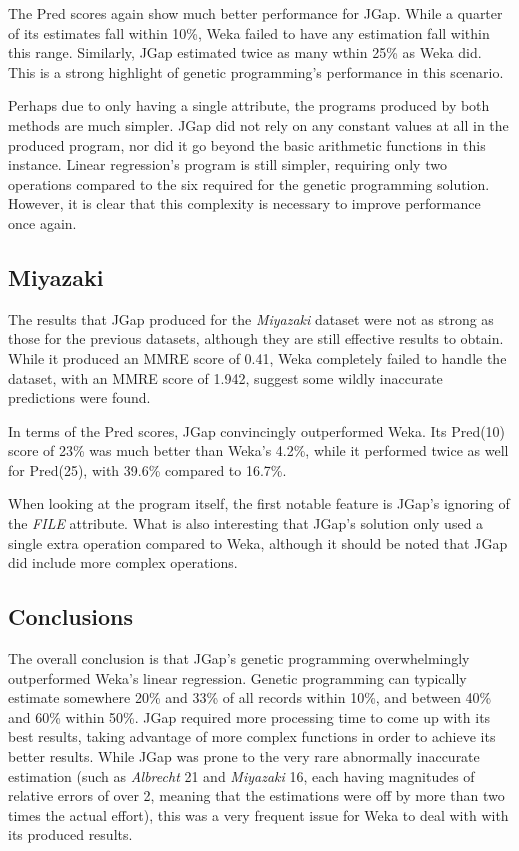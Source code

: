 \documentclass[11pt, a4paper]{article}
\begin{document}
The Pred scores again show much better performance for JGap. While a quarter of
its estimates fall within 10\%, Weka failed to have any estimation fall within
this range. Similarly, JGap estimated twice as many wthin 25\% as Weka did. This
is a strong highlight of genetic programming's performance in this scenario.

Perhaps due to only having a single attribute, the programs produced by both
methods are much simpler. JGap did not rely on any constant values at all in
the produced program, nor did it go beyond the basic arithmetic functions in
this instance. Linear regression's program is still simpler, requiring only two
operations compared to the six required for the genetic programming solution.
However, it is clear that this complexity is necessary to improve performance
once again.

\subsection{Miyazaki} %
\label{sub:miyazaki_comp}
The results that JGap produced for the \emph{Miyazaki} dataset were not as
strong as those for the previous datasets, although they are still effective
results to obtain. While it produced an MMRE score of 0.41, Weka completely
failed to handle the dataset, with an MMRE score of 1.942, suggest some wildly
inaccurate predictions were found.

In terms of the Pred scores, JGap convincingly outperformed Weka. Its Pred(10)
score of 23\% was much better than Weka's 4.2\%, while it performed twice as
well for Pred(25), with 39.6\% compared to 16.7\%.

When looking at the program itself, the first notable feature is JGap's ignoring
of the \emph{FILE} attribute. What is also interesting that JGap's solution only
used a single extra operation compared to Weka, although it should be noted that
JGap did include more complex operations.

\subsection{Conclusions} %
\label{sub:conclusions}
The overall conclusion is that JGap's genetic programming overwhelmingly
outperformed Weka's linear regression. Genetic programming can typically
estimate somewhere 20\% and 33\% of all records within 10\%, and between 40\%
and 60\% within 50\%. JGap required more processing time to come up with its
best results, taking advantage of more complex functions in order to achieve
its better results. While JGap was prone to the very rare abnormally inaccurate
estimation (such as \emph{Albrecht} 21 and \emph{Miyazaki} 16, each having
magnitudes of relative errors of over 2, meaning that the estimations were
off by more than two times the actual effort), this was a very frequent issue
for Weka to deal with with its produced results. 
\end{document}
